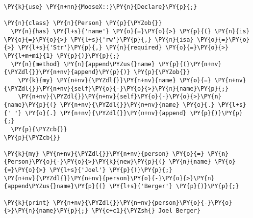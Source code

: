\begin{Verbatim}[commandchars=\\\{\}]
\PY{k}{use} \PY{n+nn}{MooseX::}\PY{n}{Declare}\PY{p}{;}

\PY{n}{class} \PY{n}{Person} \PY{p}{\PYZob{}}
  \PY{n}{has} \PY{l+s}{'name'} \PY{o}{=}\PY{o}{>} \PY{p}{(} \PY{n}{is} \PY{o}{=}\PY{o}{>} \PY{l+s}{'rw'}\PY{p}{,} \PY{n}{isa} \PY{o}{=}\PY{o}{>} \PY{l+s}{'Str'}\PY{p}{,} \PY{n}{required} \PY{o}{=}\PY{o}{>} \PY{l+m+mi}{1} \PY{p}{)}\PY{p}{;}
  \PY{n}{method} \PY{n}{append\PYZus{}name} \PY{p}{(}\PY{n+nv}{\PYZdl{}}\PY{n+nv}{append}\PY{p}{)} \PY{p}{\PYZob{}}
    \PY{k}{my} \PY{n+nv}{\PYZdl{}}\PY{n+nv}{name} \PY{o}{=} \PY{n+nv}{\PYZdl{}}\PY{n+nv}{self}\PY{o}{-}\PY{o}{>}\PY{n}{name}\PY{p}{;}
    \PY{n+nv}{\PYZdl{}}\PY{n+nv}{self}\PY{o}{-}\PY{o}{>}\PY{n}{name}\PY{p}{(} \PY{n+nv}{\PYZdl{}}\PY{n+nv}{name} \PY{o}{.} \PY{l+s}{' '} \PY{o}{.} \PY{n+nv}{\PYZdl{}}\PY{n+nv}{append} \PY{p}{)}\PY{p}{;}
  \PY{p}{\PYZcb{}}
\PY{p}{\PYZcb{}}

\PY{k}{my} \PY{n+nv}{\PYZdl{}}\PY{n+nv}{person} \PY{o}{=} \PY{n}{Person}\PY{o}{-}\PY{o}{>}\PY{k}{new}\PY{p}{(} \PY{n}{name} \PY{o}{=}\PY{o}{>} \PY{l+s}{'Joel'} \PY{p}{)}\PY{p}{;}
\PY{n+nv}{\PYZdl{}}\PY{n+nv}{person}\PY{o}{-}\PY{o}{>}\PY{n}{append\PYZus{}name}\PY{p}{(} \PY{l+s}{'Berger'} \PY{p}{)}\PY{p}{;}

\PY{k}{print} \PY{n+nv}{\PYZdl{}}\PY{n+nv}{person}\PY{o}{-}\PY{o}{>}\PY{n}{name}\PY{p}{;} \PY{c+c1}{\PYZsh{} Joel Berger}
\end{Verbatim}
